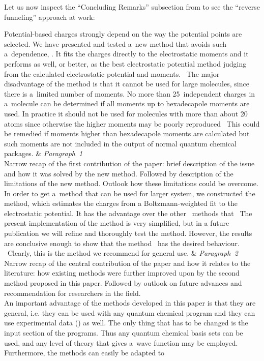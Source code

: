 Let us now inspect the ``Concluding Remarks'' subsection from \citet{sigfridsson} to see the ``reverse funneling'' approach at work:
\begin{longtblr}{}
	Potential-based charges strongly depend on the way the potential points are selected. We have presented and tested a~new method that avoids such a~dependence, . It fits the charges directly to the electrostatic moments and it performs as well, or better, as the best electrostatic potential method judging from the calculated electrostatic potential and moments. \textellipsis\ The major disadvantage of the method is that it cannot be used for large molecules, since there is a~limited number of moments. No more than 25~independent charges in a~molecule can be determined if all moments up to hexadecapole moments are used. In practice it should not be used for molecules with more than about 20 atoms since otherwise the higher moments may be poorly reproduced \textellipsis\ This could be remedied if moments higher than hexadecapole moments are calculated but such moments are not included in the output of normal quantum chemical packages.
	&
	{%
		\textit{Paragraph~1} \\
		Narrow recap of the first contribution of the paper: brief description of the issue and how it was solved by the new method. Followed by description of the limitations of the new method. Outlook how these limitations could be overcome.
	}
	\\
	\hspace{\smalllinespacing}In order to get a~method that can be used for larger system, we constructed the  method, which estimates the charges from a Boltzmann-weighted fit to the electrostatic potential. It has the advantage over the other \textellipsis\ methods that \textellipsis\ The present implementation of the  method is very simplified, but in a future publication we will refine and thoroughly test the method. However, the results are conclusive enough to show that the method \textellipsis\ has the desired behaviour. \textellipsis\ Clearly, this is the method we recommend for general use.
	&
	{%
		\textit{Paragraph~2} \\
		Narrow recap of the central contribution of the paper and how it relates to the literature: how existing methods were further improved upon by the second method proposed in this paper. Followed by outlook on future advances and recommendation for researchers in the field.
	}
	\\
	\hspace{\smalllinespacing}An important advantage of the methods developed in this paper is that they are general, i.e. they can be used with any quantum chemical program and they can use experimental data (\textellipsis\!) as well. The only thing that has to be changed is the input section of the programs. Thus any quantum chemical basis sets can be used, and any level of theory that gives a~wave function may be employed. Furthermore, the methods can easily be adapted to \textellipsis

\end{longtblr}
